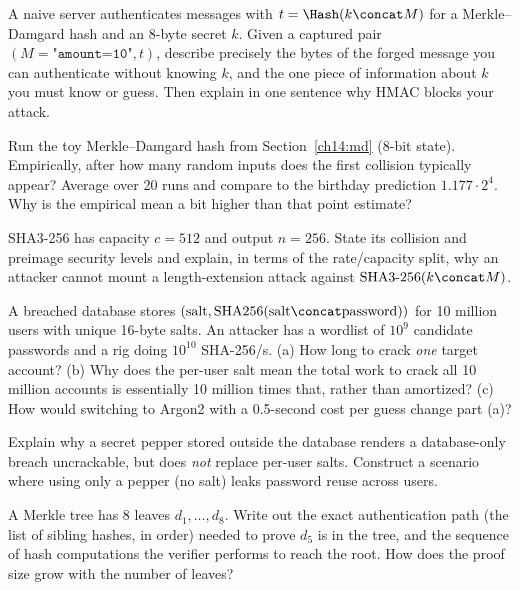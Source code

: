 \begin{exercise}
A naive server authenticates messages with $t = \Hash(k \concat M)$ for a Merkle--Damgard hash and an 8-byte secret $k$. Given a captured pair $(M = \texttt{"amount=10"}, t)$, describe precisely the bytes of the forged message you can authenticate without knowing $k$, and the one piece of information about $k$ you must know or guess. Then explain in one sentence why HMAC blocks your attack.
\end{exercise}

\begin{exercise}
Run the toy Merkle--Damgard hash from Section~\ref{ch14:md} (8-bit state). Empirically, after how many random inputs does the first collision typically appear? Average over 20 runs and compare to the birthday prediction $1.177 \cdot 2^{4}$. Why is the empirical mean a bit higher than that point estimate?
\end{exercise}

\begin{exercise}
SHA3-256 has capacity $c = 512$ and output $n = 256$. State its collision and preimage security levels and explain, in terms of the rate/capacity split, why an attacker cannot mount a length-extension attack against $\text{SHA3-256}(k \concat M)$.
\end{exercise}

\begin{exercise}
A breached database stores $(\text{salt}, \text{SHA256}(\text{salt}\concat\text{password}))$ for 10 million users with unique 16-byte salts. An attacker has a wordlist of $10^{9}$ candidate passwords and a rig doing $10^{10}$ SHA-256/s. (a) How long to crack \emph{one} target account? (b) Why does the per-user salt mean the total work to crack all 10 million accounts is essentially 10 million times that, rather than amortized? (c) How would switching to Argon2 with a 0.5-second cost per guess change part (a)?
\end{exercise}

\begin{exercise}[Pepper]
Explain why a secret pepper stored outside the database renders a database-only breach uncrackable, but does \emph{not} replace per-user salts. Construct a scenario where using only a pepper (no salt) leaks password reuse across users.
\end{exercise}

\begin{exercise}
A Merkle tree has 8 leaves $d_1, \dots, d_8$. Write out the exact authentication path (the list of sibling hashes, in order) needed to prove $d_5$ is in the tree, and the sequence of hash computations the verifier performs to reach the root. How does the proof size grow with the number of leaves?
\end{exercise}

